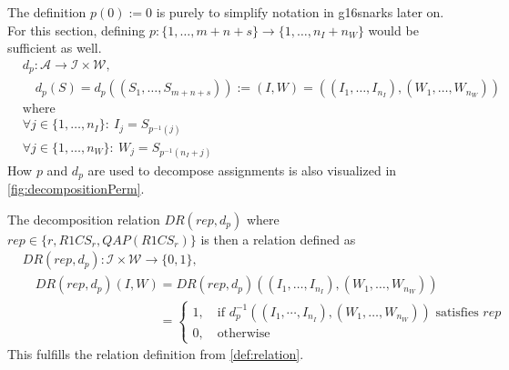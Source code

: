 \begin{definition}
{        The definition $p(0):=0$ is purely to simplify notation in \glspl{g16snark} later on. 
        For this section, defining $p:\{1,\dots, m+n+s\}\to\{1,\dots, n_I + n_W\}$ would be sufficient as well.
    }
    \begin{align*}
        &d_p:\mathcal{A}\to\mathcal{I}\times\mathcal{W},\\
        &\quad d_p(S)=d_p((S_1,\dots, S_{m+n+s})):=(I,W)=((I_1,\dots,I_{n_I}),(W_1,\dots, W_{n_W}))\\
        &\text{where}\\
        &\forall j\in\{1,\dots,{n_I}\}:\:I_j=S_{p^{-1}(j)}\\
        &\forall j\in\{1,\dots,{n_W}\}:\: W_j=S_{p^{-1}({n_I}+j)}
    \end{align*}
    How $p$ and $d_p$ are used to decompose assignments is also visualized in \cref{fig:decompositionPerm}.

    The decomposition relation $DR(rep, d_p)$ where $rep\in\{r, R1CS_r, QAP(R1CS_r)\}$ is then a relation defined as
    \begin{align*}
        &DR(rep, d_p): \mathcal{I}\times\mathcal{W}\to\{0,1\}, \\
        &\quad DR(rep,d_p)(I, W)=DR(rep, d_p)((I_1,\dots, I_{n_I}), (W_1,\dots, W_{n_W}))\\
        &\phantom{\quad DR(rep,d_p)(I, W)}=\begin{cases}
            1, \quad \text{if } d_p^{-1}((I_1,\cdots, I_{n_I}), (W_1,\dots, W_{n_W})) \text{ satisfies } rep\\
            0, \quad \text{otherwise}
        \end{cases}
    \end{align*}
    This fulfills the relation definition from \cref{def:relation}.
\end{definition}

